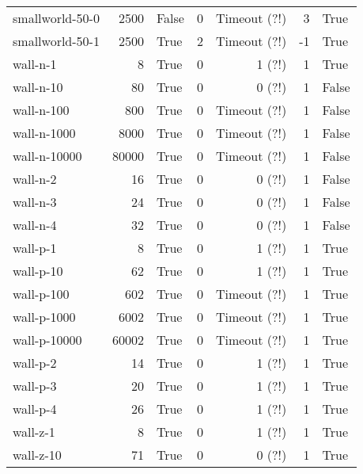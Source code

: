 \begin{longtable}{lrlrrrl}
smallworld-50-0 & 2500 & False & 0 & Timeout (?!) & 3 & True \\

smallworld-50-1 & 2500 & True & 2 & Timeout (?!) & -1 & True \\

wall-n-1 & 8 & True & 0 & 1 (?!) & 1 & True \\

wall-n-10 & 80 & True & 0 & 0 (?!) & 1 & False \\

wall-n-100 & 800 & True & 0 & Timeout (?!) & 1 & False \\

wall-n-1000 & 8000 & True & 0 & Timeout (?!) & 1 & False \\

wall-n-10000 & 80000 & True & 0 & Timeout (?!) & 1 & False \\

wall-n-2 & 16 & True & 0 & 0 (?!) & 1 & False \\

wall-n-3 & 24 & True & 0 & 0 (?!) & 1 & False \\

wall-n-4 & 32 & True & 0 & 0 (?!) & 1 & False \\

wall-p-1 & 8 & True & 0 & 1 (?!) & 1 & True \\

wall-p-10 & 62 & True & 0 & 1 (?!) & 1 & True \\

wall-p-100 & 602 & True & 0 & Timeout (?!) & 1 & True \\

wall-p-1000 & 6002 & True & 0 & Timeout (?!) & 1 & True \\

wall-p-10000 & 60002 & True & 0 & Timeout (?!) & 1 & True \\

wall-p-2 & 14 & True & 0 & 1 (?!) & 1 & True \\

wall-p-3 & 20 & True & 0 & 1 (?!) & 1 & True \\

wall-p-4 & 26 & True & 0 & 1 (?!) & 1 & True \\

wall-z-1 & 8 & True & 0 & 1 (?!) & 1 & True \\

wall-z-10 & 71 & True & 0 & 0 (?!) & 1 & True \\


\end{longtable}
